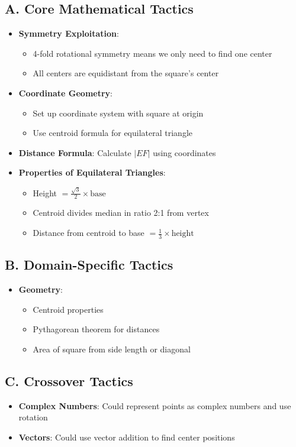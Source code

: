 \documentclass[]{article}
\begin{document}
\begin{tacticalbox}
\subsection*{A. Core Mathematical Tactics}
\begin{itemize}[leftmargin=*]
    \item \textbf{Symmetry Exploitation}: 
    \begin{itemize}
        \item 4-fold rotational symmetry means we only need to find one center
        \item All centers are equidistant from the square's center
    \end{itemize}
    \item \textbf{Coordinate Geometry}: 
    \begin{itemize}
        \item Set up coordinate system with square at origin
        \item Use centroid formula for equilateral triangle
    \end{itemize}
    \item \textbf{Distance Formula}: Calculate $|EF|$ using coordinates
    \item \textbf{Properties of Equilateral Triangles}: 
    \begin{itemize}
        \item Height $= \frac{\sqrt{3}}{2} \times \text{base}$
        \item Centroid divides median in ratio 2:1 from vertex
        \item Distance from centroid to base $= \frac{1}{3} \times \text{height}$
    \end{itemize}
\end{itemize}

\subsection*{B. Domain-Specific Tactics}
\begin{itemize}[leftmargin=*]
    \item \textbf{Geometry}: 
    \begin{itemize}
        \item Centroid properties
        \item Pythagorean theorem for distances
        \item Area of square from side length or diagonal
    \end{itemize}
\end{itemize}

\subsection*{C. Crossover Tactics}
\begin{itemize}[leftmargin=*]
    \item \textbf{Complex Numbers}: Could represent points as complex numbers and use rotation
    \item \textbf{Vectors}: Could use vector addition to find center positions
\end{itemize}
\end{tacticalbox}
\end{document}
